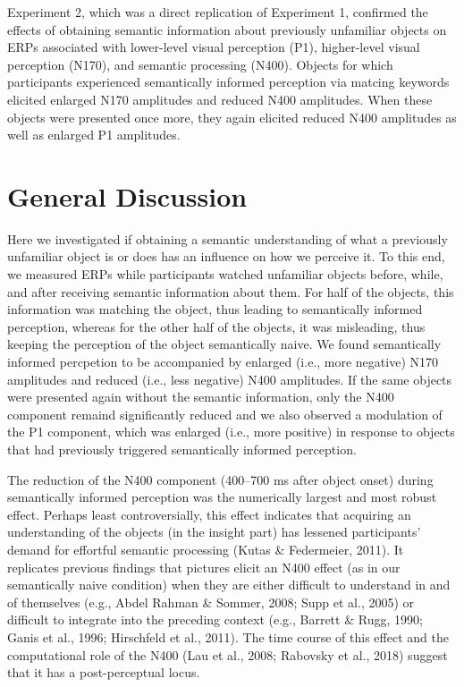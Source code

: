 \documentclass[
  english,
  doc,12pt,twoside,floatsintext]{apa7}
\begin{document}
Experiment 2, which was a direct replication of Experiment 1, confirmed the effects of obtaining semantic information about previously unfamiliar objects on ERPs associated with lower-level visual perception (P1), higher-level visual perception (N170), and semantic processing (N400). Objects for which participants experienced semantically informed perception via matcing keywords elicited enlarged N170 amplitudes and reduced N400 amplitudes. When these objects were presented once more, they again elicited reduced N400 amplitudes as well as enlarged P1 amplitudes.

\hypertarget{general-discussion}{%
\section{General Discussion}\label{general-discussion}}

Here we investigated if obtaining a semantic understanding of what a previously unfamiliar object is or does has an influence on how we perceive it. To this end, we measured ERPs while participants watched unfamiliar objects before, while, and after receiving semantic information about them. For half of the objects, this information was matching the object, thus leading to semantically informed perception, whereas for the other half of the objects, it was misleading, thus keeping the perception of the object semantically naive. We found semantically informed percpetion to be accompanied by enlarged (i.e., more negative) N170 amplitudes and reduced (i.e., less negative) N400 amplitudes. If the same objects were presented again without the semantic information, only the N400 component remaind significantly reduced and we also observed a modulation of the P1 component, which was enlarged (i.e., more positive) in response to objects that had previously triggered semantically informed perception.

The reduction of the N400 component (400--700 ms after object onset) during semantically informed perception was the numerically largest and most robust effect. Perhaps least controversially, this effect indicates that acquiring an understanding of the objects (in the insight part) has lessened participants' demand for effortful semantic processing (Kutas \& Federmeier, 2011). It replicates previous findings that pictures elicit an N400 effect (as in our semantically naive condition) when they are either difficult to understand in and of themselves (e.g., Abdel Rahman \& Sommer, 2008; Supp et al., 2005) or difficult to integrate into the preceding context (e.g., Barrett \& Rugg, 1990; Ganis et al., 1996; Hirschfeld et al., 2011). The time course of this effect and the computational role of the N400 (Lau et al., 2008; Rabovsky et al., 2018) suggest that it has a post-perceptual locus.
\end{document}
